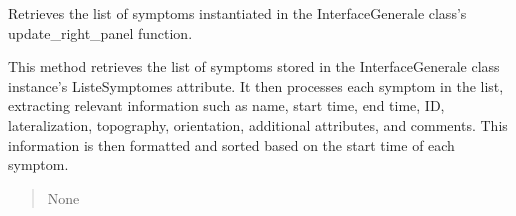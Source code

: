 \documentclass[letterpaper,10pt,english]{sphinxmanual}
\begin{document}
\begin{fulllineitems}
\begin{fulllineitems}
\begin{quote}
\begin{description}
\end{description}\end{quote}

\end{fulllineitems}


\begin{fulllineitems}
\label{\detokenize{general_interface:general_interface_V10.FriseSymptomes.afficher}}
\pysigstartsignatures
{}
\pysigstopsignatures
\sphinxAtStartPar
Retrieves the list of symptoms instantiated in the InterfaceGenerale class’s update\_right\_panel function.

\sphinxAtStartPar
This method retrieves the list of symptoms stored in the InterfaceGenerale class instance’s ListeSymptomes attribute.
It then processes each symptom in the list, extracting relevant information such as name, start time, end time,
ID, lateralization, topography, orientation, additional attributes, and comments. This information is then formatted
and sorted based on the start time of each symptom.
\begin{quote}\begin{description}
\sphinxAtStartPar
None

\end{description}\end{quote}

\end{fulllineitems}


\end{fulllineitems}

\end{document}
